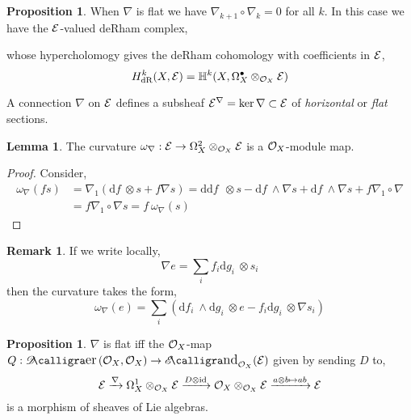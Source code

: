 \documentclass[12pt]{extarticle}
\DeclareMathOperator{\calEnd}{\mathscr{E}\text{\kern -3pt {\calligra\large nd}}}
\DeclareMathOperator{\calDer}{\mathscr{D}\text{\kern -3pt {\calligra\large er}}}
\newcommand{\shEnd}[2]{\calEnd_{#1} \! \left( #2 \right)}
\newcommand{\shDer}[2]{\calDer\left( #1, #2 \right)}
\newcommand{\id}{\mathrm{id}}
\renewcommand{\d}[1]{ \mathrm{d}#1 \:}
\theoremstyle{definition}
\newtheorem{lemma}[theorem]{Lemma}
\newtheorem{proposition}[theorem]{Proposition}
\newtheorem{remark}{Remark}
\newenvironment{definition}[1][Definition:]{\begin{trivlist}
\item[\hskip \labelsep {\bfseries #1}]}{\end{trivlist}}
\renewcommand{\H}{\mathbb{H}}
\begin{document}
\begin{proposition}
When $\nabla$ is flat we have $\nabla_{k + 1} \circ \nabla_k = 0$ for all $k$. In this case we have the $\mathcal{E}$-valued deRham complex,
\begin{center}
\end{center}
whose hypercholomogy gives the deRham cohomology with coefficients in $\mathcal{E}$,
\[ H^k_{\text{dR}}(X, \E) = \H^k(X, \Omega^\bullet_X \otimes_{\struct{X}} \E) \]
\end{proposition}

\begin{definition}
A connection $\nabla$ on $\mathcal{E}$ defines a subsheaf $\mathcal{E}^\nabla = \ker{\nabla} \subset \mathcal{E}$ of \textit{horizontal} or \textit{flat} sections.
\end{definition}


\begin{lemma}
The curvature $\omega_\nabla : \mathcal{E} \to \Omega^2_X \otimes_{\mathcal{O}_{X}} \mathcal{E}$ is a $\mathcal{O}_{X}$-module map.
\end{lemma}

\begin{proof}
Consider,
\begin{align*}
\omega_\nabla(f s) & = \nabla_1 (\d{f} \otimes s + f \nabla s) = \d{\d{f}} \otimes s - \d{f} \wedge \nabla s + \d{f} \wedge \nabla s + f \nabla_1 \circ \nabla 
\\
& = f \nabla_1 \circ \nabla s = f \: \omega_\nabla (s) 
\end{align*} 
\end{proof}

\begin{remark}
If we write locally,
\[ \nabla e = \sum_i f_i \d{g_i} \otimes s_i \]
then the curvature takes the form,
\[ \omega_\nabla (e) = \sum_{i} (\d{f_i} \wedge \d{g_i} \otimes e - f_i \d{g_i} \otimes \nabla s_i) \]
\end{remark}

\begin{proposition}
$\nabla$ is flat iff the $\mathcal{O}_{X}$-map $Q : \shDer{\struct{X}}{\struct{X}} \to \shEnd{\struct{X}}{\mathcal{E}}$ given by sending $D$ to,
\[ \mathcal{E} \xrightarrow{\nabla} \Omega^1_X \otimes_{\struct{X}} \mathcal{E} \xrightarrow{D \otimes \id} \struct{X} \otimes_{\struct{X}} \mathcal{E} \xrightarrow{a \otimes b \mapsto ab} \mathcal{E} \]
is a morphism of sheaves of Lie algebras.
\end{proposition}
\end{document}
